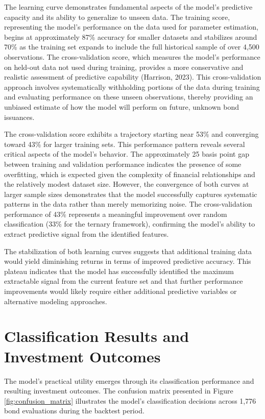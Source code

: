The learning curve demonstrates fundamental aspects of the model's predictive capacity and its ability to generalize to unseen data. The training score, representing the model's performance on the data used for parameter estimation, begins at approximately 87\% accuracy for smaller datasets and stabilizes around 70\% as the training set expands to include the full historical sample of over 4,500 observations. The cross-validation score, which measures the model's performance on held-out data not used during training, provides a more conservative and realistic assessment of predictive capability (Harrison, 2023). This cross-validation approach involves systematically withholding portions of the data during training and evaluating performance on these unseen observations, thereby providing an unbiased estimate of how the model will perform on future, unknown bond issuances.

The cross-validation score exhibits a trajectory starting near 53\% and converging toward 43\% for larger training sets. This performance pattern reveals several critical aspects of the model's behavior. The approximately 25 basis point gap between training and validation performance indicates the presence of some overfitting, which is expected given the complexity of financial relationships and the relatively modest dataset size. However, the convergence of both curves at larger sample sizes demonstrates that the model successfully captures systematic patterns in the data rather than merely memorizing noise. The cross-validation performance of 43\% represents a meaningful improvement over random classification (33\% for the ternary framework), confirming the model's ability to extract predictive signal from the identified features.

The stabilization of both learning curves suggests that additional training data would yield diminishing returns in terms of improved predictive accuracy. This plateau indicates that the model has successfully identified the maximum extractable signal from the current feature set and that further performance improvements would likely require either additional predictive variables or alternative modeling approaches.

\section{Classification Results and Investment Outcomes}

The model's practical utility emerges through its classification performance and resulting investment outcomes. The confusion matrix presented in Figure \ref{fig:confusion_matrix} illustrates the model's classification decisions across 1,776 bond evaluations during the backtest period.

